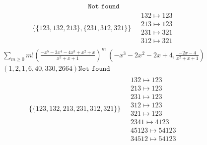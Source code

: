 \begin{scriptsize}
$$\begin{matrix}
\texttt{Not found}
\end{matrix}
$$
\begin{align}
\{\{123, 132, 213\}, \{231, 312, 321\}\}
\ 
&
\begin{matrix}
132 \mapsto 123
\\
213 \mapsto 123
\\
231 \mapsto 321
\\
312 \mapsto 321
\end{matrix}
\end{align}
$$
\begin{matrix}
\sum_{m \geq 0} m! \left(
\frac{-x^{5} - 3 x^{4} - 4 x^{3} + x^{2} + x}{x^{2} + x + 1}
\right)^m
\ 
\left(-x^{3} - 2 x^{2} - 2 x + 4, \frac{-2 x - 4}{x^{2} + x + 1}\right)
\\
\left(1, 2, 1, 6, 40, 330, 2664\right)
\texttt{Not found}
\end{matrix}
$$
\begin{align}
\{\{123, 132, 213, 231, 312, 321\}\}
\ 
&
\begin{matrix}
132 \mapsto 123
\\
213 \mapsto 123
\\
231 \mapsto 123
\\
312 \mapsto 123
\\
321 \mapsto 123
\\
2341 \mapsto 4123
\\
45123 \mapsto 54123
\\
34512 \mapsto 54123
\end{matrix}
\end{align}
\end{scriptsize}
